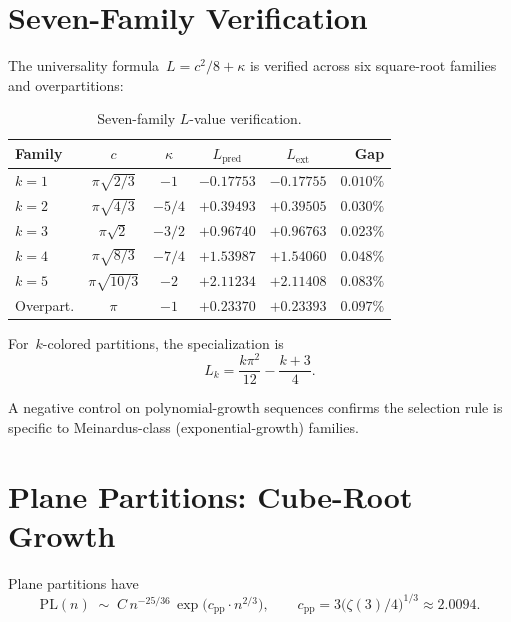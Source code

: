 \documentclass[11pt,a4paper]{article}
\begin{document}
\section{Seven-Family Verification}\label{sec:verification}

The universality formula~$L = c^2/8 + \kappa$ is verified across six square-root families and overpartitions:

\begin{table}[ht]
\centering
\caption{Seven-family $L$-value verification.}
\label{tab:7family}
\begin{tabular}{@{}lccccr@{}}
\toprule
Family & $c$ & $\kappa$ & $L_{\mathrm{pred}}$ & $L_{\mathrm{ext}}$ & Gap \\
\midrule
$k=1$ & $\pi\sqrt{2/3}$ & $-1$   & $-0.17753$ & $-0.17755$ & $0.010\%$ \\
$k=2$ & $\pi\sqrt{4/3}$ & $-5/4$ & $+0.39493$ & $+0.39505$ & $0.030\%$ \\
$k=3$ & $\pi\sqrt{2}$   & $-3/2$ & $+0.96740$ & $+0.96763$ & $0.023\%$ \\
$k=4$ & $\pi\sqrt{8/3}$ & $-7/4$ & $+1.53987$ & $+1.54060$ & $0.048\%$ \\
$k=5$ & $\pi\sqrt{10/3}$& $-2$   & $+2.11234$ & $+2.11408$ & $0.083\%$ \\
Overpart. & $\pi$        & $-1$   & $+0.23370$ & $+0.23393$ & $0.097\%$ \\
\bottomrule
\end{tabular}
\end{table}

For~$k$-colored partitions, the specialization is
\begin{equation}\label{eq:L_k}
  L_k = \frac{k\pi^2}{12} - \frac{k+3}{4}.
\end{equation}

A negative control on polynomial-growth sequences confirms the selection rule is specific to Meinardus-class (exponential-growth) families.

\section{Plane Partitions: Cube-Root Growth}\label{sec:plane_partitions}

Plane partitions have
\[
  \mathrm{PL}(n) \;\sim\; C\,n^{-25/36}\,\exp\!\bigl(c_{\mathrm{pp}} \cdot n^{2/3}\bigr),
  \qquad c_{\mathrm{pp}} = 3\bigl(\zeta(3)/4\bigr)^{1/3} \approx 2.0094.
\]
\end{document}
